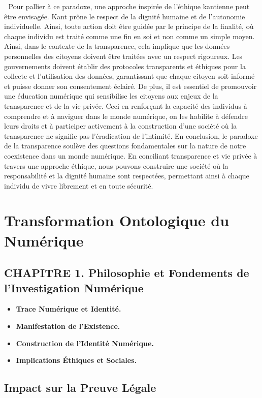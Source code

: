 \documentclass[12pt,a4paper]{article}
\begin{document}
	Pour pallier à ce paradoxe, une approche inspirée de l’éthique kantienne peut être envisagée. Kant prône le respect de la dignité humaine et de l'autonomie individuelle. Ainsi, toute action doit être guidée par le principe de la finalité, où chaque individu est traité comme une fin en soi et non comme un simple moyen. Ainsi, dans le contexte de la transparence, cela implique que les données personnelles des citoyens doivent être traitées avec un respect rigoureux. Les gouvernements doivent établir des protocoles transparents et éthiques pour la collecte et l'utilisation des données, garantissant que chaque citoyen soit informé et puisse donner son consentement éclairé.
De plus, il est essentiel de promouvoir une éducation numérique qui sensibilise les citoyens aux enjeux de la transparence et de la vie privée. Ceci en renforçant la capacité des individus à comprendre et à naviguer dans le monde numérique, on les habilite à défendre leurs droits et à participer activement à la construction d'une société où la transparence ne signifie pas l'éradication de l'intimité.
En conclusion, le paradoxe de la transparence soulève des questions fondamentales sur la nature de notre coexistence dans un monde numérique. En conciliant transparence et vie privée à travers une approche éthique, nous pouvons construire une société où la responsabilité et la dignité humaine sont respectées, permettant ainsi à chaque individu de vivre librement et en toute sécurité.

\section{Transformation Ontologique du Numérique}

\subsection*{CHAPITRE 1. Philosophie et Fondements de l’Investigation Numérique}

\begin{itemize}
    \item \textbf{Trace Numérique et Identité.}
    \item \textbf{Manifestation de l'Existence.}
    \item \textbf{Construction de l’Identité Numérique.}
    \item \textbf{Implications Éthiques et Sociales.}
\end{itemize}

\subsection*{Impact sur la Preuve Légale}
\end{document}
